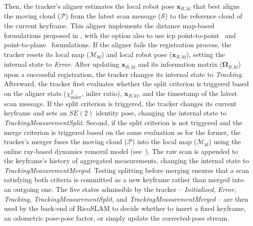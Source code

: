 

Then, the tracker's aligner estimates the local robot pose $\mathbf{x}_{R,\mathrm{kf}}$
that best aligns the moving cloud ($\mathcal{P}$) from the latest scan message ($\mathcal{S}$)
to the reference cloud of the current keyframe. This aligner implements the
distance map-based formulations proposed in , with
the option also to use \gls{icp} point-to-point~\cite{besl-mckay:tpami:1992} and
point-to-plane~\cite{chen-medioni:icra:1991} formulations.
If the aligner fails the registration process, the tracker resets its
local map ($\mathcal{M}_{\mathrm{kf}}$) and local robot pose
($\mathbf{x}_{R,\mathrm{kf}}$), setting the internal state to \emph{Error}.
After updating $\mathbf{x}_{R,\mathrm{kf}}$ and its information matrix
($\boldsymbol{\Omega}_{R,\mathrm{kf}}$) upon a successful registration,
the tracker changes its internal state to \emph{Tracking}.
Afterward, the tracker first evaluates whether the split criterion is triggered
based on the aligner stats ($\chi_{\mathrm{inlier}}^2$, inlier ratio),
$\mathbf{x}_{R,\mathrm{kf}}$, and the timestamp of the latest scan message.
If the split criterion is triggered, the tracker changes its current keyframe
and sets an $SE(2)$ identity pose, changing the internal state to
\emph{TrackingMeasurementSplit}. Second, if the split criterion is not triggered
and the merge criterion is triggered based on the same evaluation as for
the former, the tracker's merger fuses the moving cloud ($\mathcal{P}$) into
the local map ($\mathcal{M}_{\mathrm{kf}}$) using the online ray-based dynamics
removal model (see~).
The raw scan is appended to the keyframe's history of aggregated measurements,
changing the internal state to \emph{TrackingMeasurementMerged}.
Testing splitting before merging ensures that a scan satisfying both criteria is
committed as a new keyframe rather than merged into an outgoing one.
The five states admissible by the tracker --
\emph{Initialized}, \emph{Error}, \emph{Tracking},
\emph{TrackingMeasurementSplit}, and \emph{TrackingMeasurementMerged} --
are then used by the back-end of RicoSLAM to decide whether to
insert a fixed keyframe, an odometric pose-pose factor, or simply
update the corrected-pose stream.

